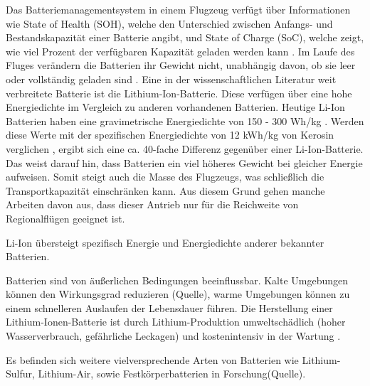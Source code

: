 Das Batteriemanagementsystem in einem Flugzeug verfügt über Informationen wie State of Health (SOH), 
welche den Unterschied zwischen Anfangs- und Bestandskapazität einer Batterie angibt, 
und State of Charge (SoC), welche zeigt, wie viel Prozent der verfügbaren Kapazität geladen werden kann \cite{donckers2024electric}.
Im Laufe des Fluges verändern die Batterien ihr Gewicht nicht, unabhängig davon, ob sie leer oder vollständig geladen sind \cite{donckers2024electric}. 
Eine in der wissenschaftlichen Literatur weit verbreitete Batterie ist die Lithium-Ion-Batterie. 
Diese verfügen über eine hohe Energiedichte im Vergleich zu anderen vorhandenen Batterien. %
Heutige Li-Ion Batterien haben eine gravimetrische Energiedichte von 150 - 300 Wh/kg \cite{colpan2022fuel}. 
Werden diese Werte mit der spezifischen Energiedichte von 12 kWh/kg von Kerosin verglichen \cite{dalmia2022powering},
ergibt sich eine ca. 40-fache Differenz gegenüber einer Li-Ion-Batterie. 
Das weist darauf hin, dass Batterien ein viel höheres Gewicht bei gleicher Energie aufweisen. 
Somit steigt auch die Masse des Flugzeugs, was schließlich die Transportkapazität einschränken kann. 
Aus diesem Grund gehen manche Arbeiten davon aus, dass dieser Antrieb 
nur für die Reichweite von Regionalflügen geeignet \cite{abrantes2024impact} ist.

Li-Ion übersteigt spezifisch Energie und Energiedichte anderer bekannter Batterien.%

Batterien sind von äußerlichen Bedingungen beeinflussbar. 
Kalte Umgebungen können den Wirkungsgrad reduzieren (Quelle), 
warme Umgebungen können zu einem schnelleren Auslaufen der Lebensdauer führen. 
Die Herstellung einer Lithium-Ionen-Batterie ist durch Lithium-Produktion umweltschädlich 
(hoher Wasserverbrauch, gefährliche Leckagen) und kostenintensiv in der Wartung \cite{dalmia2022powering}. 

Es befinden sich weitere vielversprechende Arten von Batterien wie 
Lithium-Sulfur, Lithium-Air, sowie Festkörperbatterien in Forschung(Quelle).
%
%


